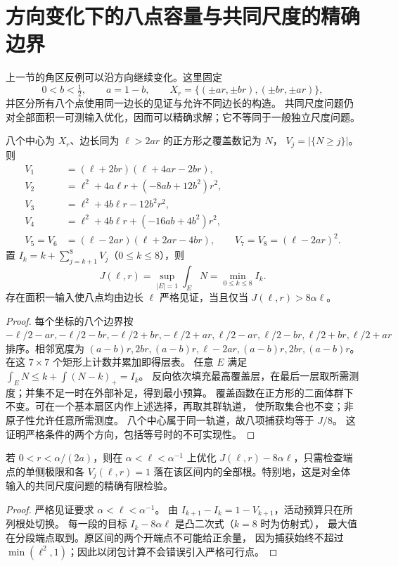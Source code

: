 \section{方向变化下的八点容量与共同尺度的精确边界}\label{cs:section}
上一节的角区反例可以沿方向继续变化。这里固定
\[
 0<b<\tfrac12,\qquad a=1-b,\qquad
 X_r=\{(\pm ar,\pm br),(\pm br,\pm ar)\},
\]
并区分所有八个点使用同一边长的见证与允许不同边长的构造。
共同尺度问题仍对全部面积一可测输入优化，因而可以精确求解；它不等同于一般独立尺度问题。

\begin{lemma}[八点共同尺度的层表与精确容量]\label{cs:layers}
八个中心为 $X_r$、边长同为 $\ell>2ar$ 的正方形之覆盖数记为 $N$，
$V_j=|\{N\ge j\}|$。则
\begin{align*}
 V_1&=(\ell+2br)(\ell+4ar-2br),\\
 V_2&=\ell^2+4a\ell r+(-8ab+12b^2)r^2,\\
 V_3&=\ell^2+4b\ell r-12b^2r^2,\\
 V_4&=\ell^2+4b\ell r+(-16ab+4b^2)r^2,\\
 V_5=V_6&=(\ell-2ar)(\ell+2ar-4br),\qquad
 V_7=V_8=(\ell-2ar)^2.
\end{align*}
置 $I_k=k+\sum_{j=k+1}^8V_j$（$0\le k\le8$），则
\[
 J(\ell,r)=\sup_{|E|=1}\int_E N=\min_{0\le k\le8}I_k.
\]
存在面积一输入使八点均由边长 $\ell$ 严格见证，当且仅当
$J(\ell,r)>8\alpha\ell$。
\end{lemma}
\begin{proof}
每个坐标的八个边界按
$-\ell/2-ar,-\ell/2-br,-\ell/2+br,-\ell/2+ar,
\ell/2-ar,\ell/2-br,\ell/2+br,\ell/2+ar$
排序。相邻宽度为
$(a-b)r,2br,(a-b)r,\ell-2ar,(a-b)r,2br,(a-b)r$。
在这 $7\times7$ 个矩形上计数并累加即得层表。
任意 $E$ 满足 $\int_E N\le k+\int(N-k)_+=I_k$。
反向依次填充最高覆盖层，在最后一层取所需测度；并集不足一时在外部补足，得到最小预算。
覆盖函数在正方形的二面体群下不变。可在一个基本扇区内作上述选择，再取其群轨道，
使所取集合也不变；非原子性允许任意所需测度。
八个中心属于同一轨道，故八项捕获均等于 $J/8$。
这证明严格条件的两个方向，包括等号时的不可实现性。
\end{proof}

\begin{proposition}[共同尺度的有限检验]\label{cs:oracle}
若 $0<r<\alpha/(2a)$，则在 $\alpha<\ell<\alpha^{-1}$ 上优化
$J(\ell,r)-8\alpha\ell$，只需检查端点的单侧极限和各 $V_j(\ell,r)=1$
落在该区间内的全部根。特别地，这是对全体输入的共同尺度问题的精确有限检验。
\end{proposition}
\begin{proof}
严格见证要求 $\alpha<\ell<\alpha^{-1}$。
由 $I_{k+1}-I_k=1-V_{k+1}$，活动预算只在所列根处切换。
每一段的目标 $I_k-8\alpha\ell$ 是凸二次式（$k=8$ 时为仿射式），
最大值在分段端点取到。原区间的两个开端点不可能给正余量，
因为捕获始终不超过 $\min(\ell^2,1)$；因此以闭包计算不会错误引入严格可行点。
\end{proof}

